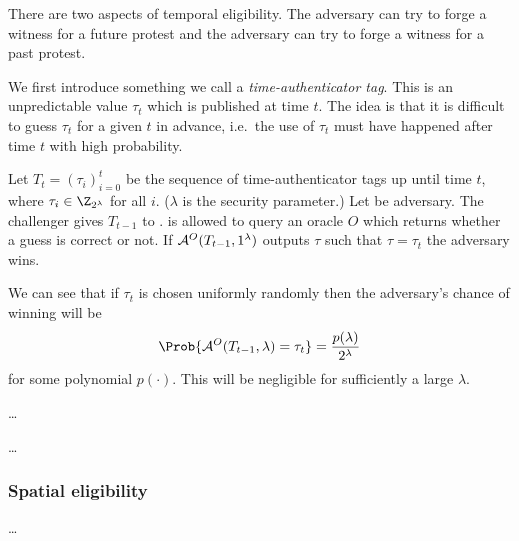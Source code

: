 There are two aspects of temporal eligibility.
The adversary can try to forge a witness for a future protest and the adversary 
can try to forge a witness for a past protest.

We first introduce something we call a \emph{time-authenticator tag}.
This is an unpredictable value \(\tau_t\) which is published at time \(t\).
The idea is that it is difficult to guess \(\tau_t\) for a given \(t\) in 
advance, i.e.\ the use of \(\tau_t\) must have happened after time \(t\) with 
high probability.

\begin{definition}
  Let \(T_t = (\tau_i)_{i=0}^{t}\) be the sequence of time-authenticator tags up 
  until time \(t\), where \(\tau_i\in \Z_{2^\lambda}\) for all \(i\).
  (\(\lambda\) is the security parameter.)
  Let \A be  adversary.
  The challenger gives \(T_{t-1}\) to \A.
  \A is allowed to query an oracle \(O\) which returns whether a guess is 
  correct or not.
  If \(\mathcal{A}^O(T_{t-1},1^\lambda)\) outputs \(\tau\) such that \(\tau = \tau_t\) 
  the adversary wins.
\end{definition}

We can see that if \(\tau_t\) is chosen uniformly randomly then the adversary's 
chance of winning will be
\begin{equation}
  \label{SuccessOfPrediction}
  \Prob{%
    \A^O(T_{t-1}, \lambda) = \tau_t
  } = \frac{p(\lambda)}{2^\lambda}
\end{equation}
for some polynomial \(p(\cdot)\).
This will be negligible for sufficiently a large \(\lambda\).

\begin{definition}
  \dots
\end{definition}

\begin{frame}
\begin{definition}
  \dots
\end{definition}
\end{frame}

\subsubsection{Spatial eligibility}

\begin{frame}
\begin{definition}
  \dots
\end{definition}
\end{frame}


